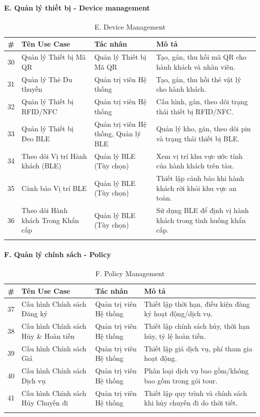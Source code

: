 \documentclass[12pt,a4paper]{article}
\begin{document}
	\paragraph{E. Quản lý thiết bị - Device management}
	\begin{longtable}{|c|p{4.5cm}|p{3.5cm}|p{4.5cm}|}
		\hline
		\textbf{\#} & \textbf{Tên Use Case} & \textbf{Tác nhân} & \textbf{Mô tả} \\
		\hline
		30 & Quản lý Thiết bị Mã QR & Quản lý Thiết bị Mã QR & Tạo, gán, thu hồi mã QR cho hành khách và nhân viên. \\
		\hline
		31 & Quản lý Thẻ Du thuyền & Quản trị viên Hệ thống & Tạo, gán, thu hồi thẻ vật lý cho hành khách. \\
		\hline
		32 & Quản lý Thiết bị RFID/NFC & Quản trị viên Hệ thống & Cấu hình, gán, theo dõi trạng thái thiết bị RFID/NFC. \\
		\hline
		33 & Quản lý Thiết bị Đeo BLE & Quản trị viên Hệ thống, Quản lý BLE & Quản lý kho, gán, theo dõi pin và trạng thái thiết bị BLE. \\
		\hline
		34 & Theo dõi Vị trí Hành khách (BLE) & Quản lý BLE (Tùy chọn) & Xem vị trí khu vực ước tính của hành khách trên tàu. \\
		\hline
		35 & Cảnh báo Vị trí BLE & Quản lý BLE (Tùy chọn) & Thiết lập cảnh báo khi hành khách rời khỏi khu vực an toàn. \\
		\hline
		36 & Theo dõi Hành khách Trong Khẩn cấp & Quản lý BLE (Tùy chọn) & Sử dụng BLE để định vị hành khách trong tình huống khẩn cấp. \\
		\hline
		\caption*{E. Device Management}
	\end{longtable}
	
	\paragraph{F. Quản lý chính sách - Policy}
	\begin{longtable}{|c|p{4.5cm}|p{3.5cm}|p{4.5cm}|}
		\hline
		\textbf{\#} & \textbf{Tên Use Case} & \textbf{Tác nhân} & \textbf{Mô tả} \\
		\hline
		37 & Cấu hình Chính sách Đăng ký & Quản trị viên Hệ thống & Thiết lập thời hạn, điều kiện đăng ký hoạt động/dịch vụ. \\
		\hline
		38 & Cấu hình Chính sách Hủy \& Hoàn tiền & Quản trị viên Hệ thống & Thiết lập chính sách hủy, thời hạn hủy, tỷ lệ hoàn tiền. \\
		\hline
		39 & Cấu hình Chính sách Giá & Quản trị viên Hệ thống & Thiết lập giá dịch vụ, phí tham gia hoạt động. \\
		\hline
		40 & Cấu hình Chính sách Dịch vụ & Quản trị viên Hệ thống & Phân loại dịch vụ bao gồm/không bao gồm trong gói tour. \\
		\hline
		41 & Cấu hình Chính sách Hủy Chuyến đi & Quản trị viên Hệ thống & Thiết lập quy trình và chính sách khi hủy chuyến đi do thời tiết. \\
		\hline
		\caption*{F. Policy Management}
	\end{longtable}
	
\end{document}
